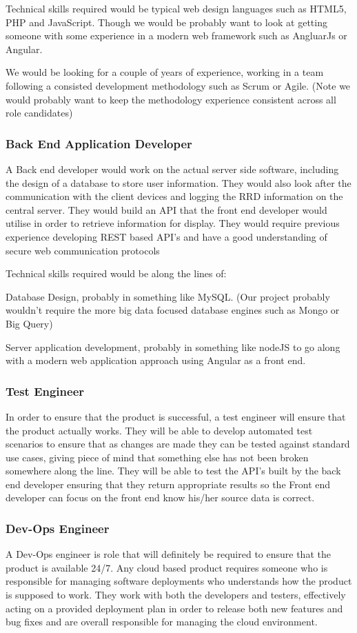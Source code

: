 \documentclass[11pt, oneside, a4paper, titlepage]{article}
\begin{document}
Technical skills required would be typical web design languages such as HTML5, PHP and JavaScript. Though we would be probably want to look at getting someone with some experience in a modern web framework such as AngluarJs or Angular. 

We would be looking for a couple of years of experience, working in a team following a consisted development methodology such as Scrum or Agile.  (Note we would probably want to keep the methodology experience consistent across all role candidates)  

\subsubsection{Back End Application Developer}
A Back end developer would work on the actual server side software, including the design of a database to store user information.  They would also look after the communication with the client devices and logging the RRD information on the central server.  They would build an API that the front end developer would utilise in order to retrieve information for display.  They would require previous experience developing REST based API's and have a good understanding of secure web communication protocols 

Technical skills required would be along the lines of: 

Database Design, probably in something like MySQL. (Our project probably wouldn't require the more big data focused database engines such as Mongo or Big Query) 

Server application development, probably in something like nodeJS to go along with a modern web application approach using Angular as a front end. 

\subsubsection{Test Engineer}
In order to ensure that the product is successful, a test engineer will ensure that the product actually works.  They will be able to develop automated test scenarios to ensure that as changes are made they can be tested against standard use cases, giving piece of mind that something else has not been broken somewhere along the line.  They will be able to test the API's built by the back end developer ensuring that they return appropriate results so the Front  end developer can focus on the front end know his/her source data is correct. 

\subsubsection{Dev-Ops Engineer}
A Dev-Ops engineer is role that will definitely be required to ensure that the product is available 24/7.  Any cloud based product requires someone who is responsible for managing software deployments who understands how the product is supposed to work.  They work with both the developers and testers, effectively acting on a provided deployment plan in order to release both new features and bug fixes and are overall responsible for managing the cloud environment. 
\end{document}
